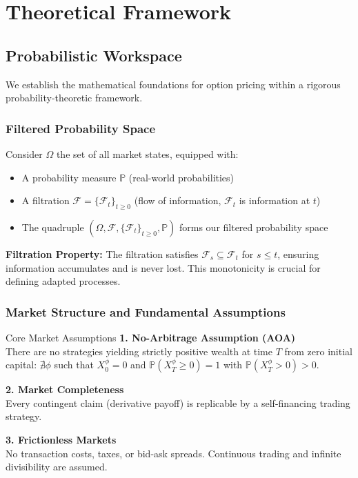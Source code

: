 \documentclass[10pt,twocolumn]{article}
\begin{document}
\section{Theoretical Framework}

\subsection{Probabilistic Workspace}

We establish the mathematical foundations for option pricing within a rigorous probability-theoretic framework.

\subsubsection{Filtered Probability Space}

Consider $\Omega$ the set of all market states, equipped with:

\begin{itemize}[leftmargin=*,itemsep=2pt]
    \item A probability measure $\mathbb{P}$ (real-world probabilities)
    \item A filtration $\mathcal{F} = \{\mathcal{F}_t\}_{t \geq 0}$ (flow of information, $\mathcal{F}_t$ is information at $t$)
    \item The quadruple $(\Omega, \mathcal{F}, \{\mathcal{F}_t\}_{t \geq 0}, \mathbb{P})$ forms our filtered probability space
\end{itemize}

\begin{notebox}
\textbf{Filtration Property:} The filtration satisfies $\mathcal{F}_s \subseteq \mathcal{F}_t$ for $s \leq t$, ensuring information accumulates and is never lost. This monotonicity is crucial for defining adapted processes.
\end{notebox}

\subsubsection{Market Structure and Fundamental Assumptions}

\begin{keybox}{Core Market Assumptions}
\textbf{1. No-Arbitrage Assumption (AOA)}\\
There are no strategies yielding strictly positive wealth at time $T$ from zero initial capital: $\nexists \phi$ such that $X_0^\phi = 0$ and $\mathbb{P}(X_T^\phi \geq 0) = 1$ with $\mathbb{P}(X_T^\phi > 0) > 0$.

\textbf{2. Market Completeness}\\
Every contingent claim (derivative payoff) is replicable by a self-financing trading strategy.

\textbf{3. Frictionless Markets}\\
No transaction costs, taxes, or bid-ask spreads. Continuous trading and infinite divisibility are assumed.
\end{keybox}
\end{document}

